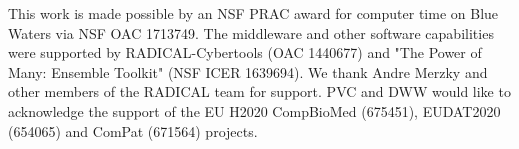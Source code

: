 This work is made possible by an NSF PRAC award for computer time on Blue Waters via
NSF OAC	1713749. The middleware and other software capabilities were supported by RADICAL-Cybertools (OAC 1440677) and "The Power of Many: Ensemble Toolkit" (NSF ICER 1639694). We thank Andre Merzky and other members of the RADICAL team for support. PVC and DWW would like to acknowledge the support of the EU H2020 CompBioMed (675451), EUDAT2020 (654065) and ComPat (671564) projects.